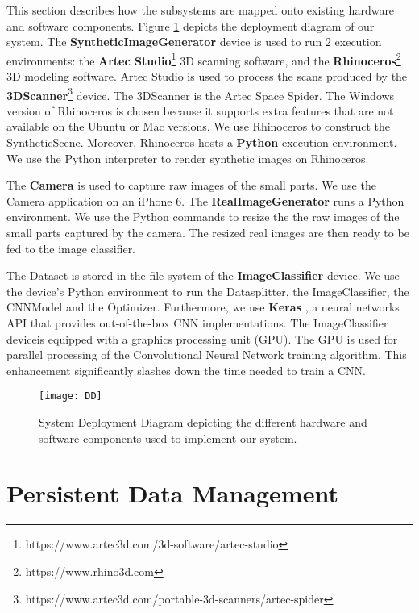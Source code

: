 This section describes how the subsystems are mapped onto existing hardware and software components. Figure \ref{fig:DD} depicts the deployment diagram of our system. The \textbf{SyntheticImageGenerator} device is used to run 2 execution environments: the \textbf{Artec Studio}\footnote{https://www.artec3d.com/3d-software/artec-studio} 3D scanning software, and the \textbf{Rhinoceros}\footnote{https://www.rhino3d.com} 3D modeling software. Artec Studio is used to process the scans produced by the \textbf{3DScanner}\footnote{https://www.artec3d.com/portable-3d-scanners/artec-spider} device. The 3DScanner is the Artec Space Spider. The Windows version of Rhinoceros is chosen because it supports extra features that are not available on the Ubuntu or Mac versions. We use Rhinoceros to construct the SyntheticScene. Moreover, Rhinoceros hosts a \textbf{Python} execution environment. We use the Python interpreter to render synthetic images on Rhinoceros.

The \textbf{Camera} is used to capture raw images of the small parts. We use the Camera application on an iPhone 6. The \textbf{RealImageGenerator} runs a Python environment. We use the Python commands to resize the the raw images of the small parts captured by the camera. The resized real images are then ready to be fed to the image classifier.

The Dataset is stored in the file system of the \textbf{ImageClassifier} device. We use the device's Python environment to run the Datasplitter, the ImageClassifier, the CNNModel and the Optimizer. Furthermore, we use \textbf{Keras} \cite{chollet2015keras}, a neural networks API that provides out-of-the-box CNN implementations. The ImageClassifier deviceis equipped with a graphics processing unit (GPU). The GPU is used for parallel processing of the Convolutional Neural Network training algorithm. This enhancement significantly slashes down the time needed to train a CNN.

\begin{figure}[h]
\centering
  \texttt{[image: DD]}
\caption{System Deployment Diagram depicting the different hardware and software components used to implement our system.}
\label{fig:DD}
\end{figure}

\section{Persistent Data Management}\label{sec:persistent_data_management}

